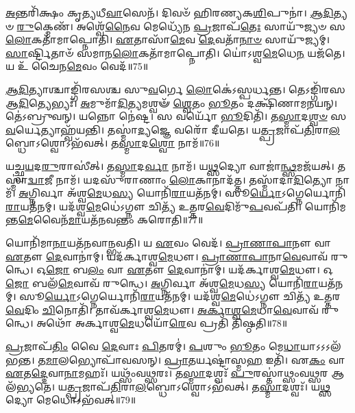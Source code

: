 \-\ul{𑌅}\-𑌨𑍍𑌤𑌰𑌿᳴𑌕𑍍𑌷𑌂 𑌕𑍃𑌤𑍍𑌯𑌧𑍀\-\ul{𑌵𑌾}\-𑌸𑍇𑌨᳴।
𑌦𑌿𑌵𑍞᳴ 𑌹𑌿𑌰𑌣𑍍𑌯𑌕\-\ul{𑌶𑌿}\-𑌪𑍁𑌨𑌾॑।
\-\ul{𑌆}\-\-\ul{𑌦𑌿}\-𑌤𑍍𑌯𑍞 \ul{𑌰𑍁}\-𑌕𑍍𑌮𑍇𑌣᳴।
𑌅𑌶𑍍𑌵𑍇᳴\-\ul{𑌨𑍈}\-𑌵 𑌮𑍇𑌧𑍍𑌯𑍇᳴𑌨 \ul{𑌪𑍍𑌰}\-𑌜𑌾𑌪᳴\-\ul{𑌤𑍇𑌃} 𑌸𑌾𑌯𑍁᳴𑌜𑍍𑌯𑍞 𑌸\-\ul{𑌲𑍋}\-𑌕𑌤𑌾᳴𑌮𑌾𑌪𑍍𑌨𑍋𑌤𑌿।
\-\ul{𑌏}\-𑌤𑌾𑌸𑌾᳴\-\ul{𑌮𑍇}\-𑌵 \ul{𑌦𑍇}\-𑌵𑌤𑌾᳴\-\ul{𑌨𑌾}\-\-\ul{𑍞} 𑌸𑌾𑌯𑍁᳴𑌜𑍍𑌯𑌮𑍍।
\-\ul{𑌸𑌾}\-𑌰𑍍𑌷𑍍𑌟𑌿𑌤𑌾𑍞᳴ 𑌸𑌮𑌾𑌨\-\ul{𑌲𑍋}\-𑌕𑌤𑌾᳴𑌮𑌾𑌪𑍍𑌨𑍋𑌤𑌿।
𑌯𑍋॑𑌽𑌶𑍍𑌵\-\ul{𑌮𑍇}\-𑌧𑍇\-\ul{𑌨} 𑌯𑌜᳴𑌤𑍇।
𑌯 𑌉᳴ 𑌚𑍈𑌨\-\ul{𑌮𑍇}\-𑌵𑌂 𑌵𑍇𑌦᳴॥75॥\anuvakamend[𑌅𑌵᳴𑌰𑍁𑌧𑍍𑌯𑌾 𑌆𑌪𑍍𑌨𑍋\-\ul{𑌤𑍍𑌯}\-𑌷𑍍𑌟𑍗 𑌚᳴]

\-\ul{𑌆}\-\-\ul{𑌦𑌿}\-𑌤𑍍𑌯𑌾𑌶𑍍𑌚𑌾𑌙𑍍𑌗𑌿᳴𑌰𑌸𑌶𑍍𑌚 𑌸𑍁\-\ul{𑌵}\-𑌰𑍍𑌗𑍇 \ul{𑌲𑍋}\-𑌕𑍇॑\-𑌽𑌸𑍍𑌪𑌰𑍍𑌧𑌨𑍍𑌤।
𑌤𑍇𑌽𑌙𑍍𑌗𑌿᳴𑌰𑌸 𑌆\-\ul{𑌦𑌿}\-𑌤𑍍𑌯𑍇𑌭𑍍𑌯𑌃᳴।
\-\ul{𑌅}\-𑌮𑍁𑌮𑌾᳴\-\ul{𑌦𑌿}\-𑌤𑍍𑌯𑌮𑌶𑍍𑌵𑍟᳴ \ul{𑌶𑍍𑌵𑍇}\-𑌤𑌂 \ul{𑌭𑍂}\-𑌤𑌂 𑌦𑌕𑍍𑌷𑌿᳴𑌣𑌾𑌮𑌨𑌯𑌨𑍍।
𑌤𑍇॑𑌽𑌬𑍍𑌰𑍁𑌵𑌨𑍍।
𑌯𑌨𑍍𑌨𑍋 𑌨𑍇॑𑌷𑍍𑌟।
𑌸 𑌵𑌰𑍍𑌯𑍋᳴ \ul{𑌭𑍂}\-𑌦𑌿𑌤𑌿᳴।
𑌤\-\ul{𑌸𑍍𑌮𑌾}\-𑌦\-\ul{𑌶𑍍𑌵}\-\-\ul{𑍞} 𑌸\-\ul{𑌵}\-𑌰𑍍𑌯𑍇𑌤𑍍𑌯𑌾𑌹𑍍𑌵᳴𑌯𑌨𑍍𑌤𑌿।
𑌤𑌸𑍍𑌮𑌾॑\-\ul{𑌦𑍍𑌯}\-𑌜𑍍𑌞𑍇 𑌵𑌰𑍋᳴ 𑌦𑍀𑌯𑌤𑍇।
𑌯\-\ul{𑌤𑍍𑌪𑍍𑌰}\-𑌜𑌾𑌪᳴\-\ul{𑌤𑌿}\-𑌰𑌾\-\-\ul{𑌲}\-𑌬𑍍𑌧𑍋\-𑌽𑌶𑍍𑌵𑍋\-𑌽𑌭᳴𑌵𑌤𑍍।
𑌤\-\ul{𑌸𑍍𑌮𑌾}\-𑌦\-\ul{𑌶𑍍𑌵𑍋} 𑌨𑌾𑌮᳴॥76॥

𑌯𑌚𑍍𑌛𑍍𑌵\-\ul{𑌯}\-𑌦\-\ul{𑌰𑍁}\-𑌰𑌾𑌸𑍀॑𑌤𑍍।
𑌤\-\ul{𑌸𑍍𑌮𑌾}\-𑌦\-\ul{𑌰𑍍𑌵𑌾} 𑌨𑌾𑌮᳴।
𑌯\-\ul{𑌥𑍍𑌸}\-𑌦𑍍𑌯𑍋 𑌵𑌾𑌜𑌾॑\-\ul{𑌨𑍍𑌥𑍍𑌸}\-𑌮\-𑌜᳴𑌯𑌤𑍍।
𑌤𑌸𑍍𑌮𑌾॑\-\ul{𑌦𑍍𑌵𑌾}\-𑌜𑍀 𑌨𑌾𑌮᳴।
𑌯𑌦𑌸𑍁᳴𑌰𑌾𑌣𑌾𑌂 \ul{𑌲𑍋}\-𑌕𑌾𑌨𑌾𑌦᳴𑌤𑍍𑌤।
𑌤𑌸𑍍𑌮𑌾᳴𑌦𑌾\-\ul{𑌦𑌿}\-𑌤𑍍𑌯𑍋 𑌨𑌾𑌮᳴।
\-\ul{𑌅}\-𑌗𑍍𑌨𑌿𑌰𑍍𑌵𑌾 𑌅᳴𑌶𑍍𑌵\-\ul{𑌮𑍇}\-𑌧\-\ul{𑌸𑍍𑌯} 𑌯𑍋𑌨𑌿᳴\-\ul{𑌰𑌾}\-\-𑌯𑌤᳴𑌨𑌮𑍍।
𑌸𑍂\-\ul{𑌰𑍍𑌯𑍋}\-\-𑌽𑌗𑍍𑌨𑍇𑌰𑍍𑌯𑍋𑌨𑌿᳴\-\ul{𑌰𑌾}\-\-𑌯𑌤᳴𑌨𑌮𑍍।
𑌯𑌦᳴𑌶𑍍𑌵\-\ul{𑌮𑍇}\-𑌧𑍇॑\-𑌽𑌗𑍍𑌨𑍗 𑌚𑌿𑌤𑍍𑌯᳴ 𑌉𑌤𑍍𑌤𑌰\-\ul{𑌵𑍇}\-𑌦𑌿𑌮𑍁᳴\-\ul{𑌪}\-𑌵𑌪᳴𑌤𑌿।
𑌯𑍋𑌨𑌿᳴𑌮𑌨𑍍𑌤\-\ul{𑌮𑍇}\-𑌵𑍈𑌨᳴\-\ul{𑌮𑌾}\-𑌯𑌤᳴𑌨𑌵𑌨𑍍𑌤𑌂 𑌕𑌰𑍋𑌤𑌿॥77॥

𑌯𑍋𑌨𑌿᳴𑌮𑌾\-\ul{𑌨𑌾}\-𑌯𑌤᳴𑌨𑌵𑌾𑌨𑍍𑌭𑌵𑌤𑌿।
𑌯 \ul{𑌏}\-𑌵𑌂 𑌵𑍇𑌦᳴।
\-\ul{𑌪𑍍𑌰𑌾}\-\-\ul{𑌣𑌾}\-\-\ul{𑌪𑌾}\-𑌨𑍗 𑌵𑌾 \ul{𑌏}\-𑌤𑍗 \ul{𑌦𑍇}\-𑌵𑌾𑌨𑌾॑𑌮𑍍।
𑌯𑌦᳴𑌰𑍍𑌕𑌾𑌶𑍍𑌵\-\ul{𑌮𑍇}\-𑌧𑍗।
\-\ul{𑌪𑍍𑌰𑌾}\-\-\ul{𑌣𑌾}\-\-\ul{𑌪𑌾}\-𑌨𑌾\-\ul{𑌵𑍇}\-𑌵𑌾𑌵᳴ 𑌰𑍁𑌨𑍍𑌧𑍇।
𑌓\-\ul{𑌜𑍋} 𑌬\-\ul{𑌲𑌂} 𑌵𑌾 \ul{𑌏}\-𑌤𑍗 \ul{𑌦𑍇}\-𑌵𑌾𑌨𑌾॑𑌮𑍍।
𑌯𑌦᳴𑌰𑍍𑌕𑌾𑌶𑍍𑌵\-\ul{𑌮𑍇}\-𑌧𑍗।
𑌓\-\ul{𑌜𑍋} 𑌬𑌲᳴\-\ul{𑌮𑍇}\-𑌵𑌾𑌵᳴ 𑌰𑍁𑌨𑍍𑌧𑍇।
\-\ul{𑌅}\-𑌗𑍍𑌨𑌿𑌰𑍍𑌵𑌾 𑌅᳴𑌶𑍍𑌵\-\ul{𑌮𑍇}\-𑌧\-\ul{𑌸𑍍𑌯} 𑌯𑍋𑌨𑌿᳴\-\ul{𑌰𑌾}\-𑌯𑌤᳴𑌨𑌮𑍍।
𑌸𑍂\-\ul{𑌰𑍍𑌯𑍋}\-\-𑌽𑌗𑍍𑌨𑍇𑌰𑍍𑌯𑍋𑌨𑌿᳴\-\ul{𑌰𑌾}\-\-𑌯𑌤᳴𑌨𑌮𑍍।
𑌯𑌦᳴𑌶𑍍𑌵\-\ul{𑌮𑍇}\-𑌧𑍇॑\-𑌽𑌗𑍍𑌨𑍗 𑌚𑌿𑌤𑍍𑌯᳴ 𑌉𑌤𑍍𑌤𑌰\-\ul{𑌵𑍇}\-𑌦𑌿𑌂 \ul{𑌚𑌿}\-𑌨𑍋𑌤𑌿᳴।
𑌤𑌾𑌵᳴𑌰𑍍𑌕𑌾𑌶𑍍𑌵\-\ul{𑌮𑍇}\-𑌧𑍗।
\-\ul{𑌅}\-\-\ul{𑌰𑍍𑌕𑌾}\-\-\ul{𑌶𑍍𑌵}\-\-\ul{𑌮𑍇}\-𑌧𑌾\-\ul{𑌵𑍇}\-𑌵𑌾𑌵᳴ 𑌰𑍁𑌨𑍍𑌧𑍇।
𑌅𑌥𑍋᳴ 𑌅𑌰𑍍𑌕𑌾𑌶𑍍𑌵\-\ul{𑌮𑍇}\-𑌧𑌯𑍋᳴\-\ul{𑌰𑍇}\-𑌵 𑌪𑍍𑌰𑌤𑌿᳴ 𑌤𑌿𑌷𑍍𑌠𑌤𑌿॥78॥\anuvakamend[𑌨𑌾𑌮᳴ 𑌕𑌰𑍋\-\ul{𑌤𑌿} 𑌸𑍂\-\ul{𑌰𑍍𑌯𑍋}\-\-𑌽𑌗𑍍𑌨𑍇𑌰𑍍𑌯𑍋𑌨𑌿᳴\-\ul{𑌰𑌾}\-𑌯𑌤᳴𑌨\-\ul{𑌞𑍍𑌚}\-𑌤𑍍𑌵𑌾𑌰𑌿᳴ 𑌚]

\-\ul{𑌪𑍍𑌰}\-𑌜𑌾𑌪᳴\-\ul{𑌤𑌿𑌂} 𑌵𑍈 \ul{𑌦𑍇}\-𑌵𑌾𑌃 \ul{𑌪𑌿}\-𑌤𑌰𑌮𑍍॑।
\-\ul{𑌪}\-𑌶𑍁𑌂 \ul{𑌭𑍂}\-𑌤𑌂 𑌮𑍇\-\ul{𑌧𑌾}\-𑌯𑌾𑌽𑌽𑌽𑌲᳴𑌭𑌨𑍍𑌤।
𑌤\-\ul{𑌮𑌾}\-𑌲𑌭𑍍𑌯𑍋𑌪𑌾᳴𑌵𑌸𑌨𑍍।
\-\ul{𑌪𑍍𑌰𑌾}\-𑌤𑌰𑍍𑌯𑌷𑍍𑌟𑌾॑𑌸𑍍𑌮\-\ul{𑌹} 𑌇𑌤𑌿᳴।
𑌏\-\ul{𑌕𑌂} 𑌵𑌾 \ul{𑌏}\-𑌤\-\ul{𑌦𑍍𑌦𑍇}\-𑌵𑌾\-\ul{𑌨𑌾}\-𑌮𑌹𑌃᳴।
𑌯𑌥𑍍𑌸𑌂᳴𑌵\-\ul{𑌥𑍍𑌸}\-𑌰𑌃।
𑌤\-\ul{𑌸𑍍𑌮𑌾}\-𑌦𑌶𑍍𑌵𑌃᳴ \ul{𑌪𑍁}\-𑌰𑌸𑍍𑌤𑌾॑𑌥𑍍𑌸𑌂𑌵\-\ul{𑌥𑍍𑌸}\-𑌰 𑌆𑌲᳴𑌭𑍍𑌯𑌤𑍇।
𑌯\-\ul{𑌤𑍍𑌪𑍍𑌰}\-𑌜𑌾𑌪᳴\-\ul{𑌤𑌿}\-𑌰𑌾\-\ul{𑌲}\-𑌬𑍍𑌧𑍋\-𑌽𑌶𑍍𑌵𑍋\-𑌽𑌭᳴𑌵𑌤𑍍।
𑌤\-\ul{𑌸𑍍𑌮𑌾}\-𑌦𑌶𑍍𑌵𑌃᳴।
𑌯\-\ul{𑌥𑍍𑌸}\-𑌦𑍍𑌯𑍋 𑌮𑍇𑌧𑍋\-𑌽𑌭᳴𑌵𑌤𑍍॥79॥

